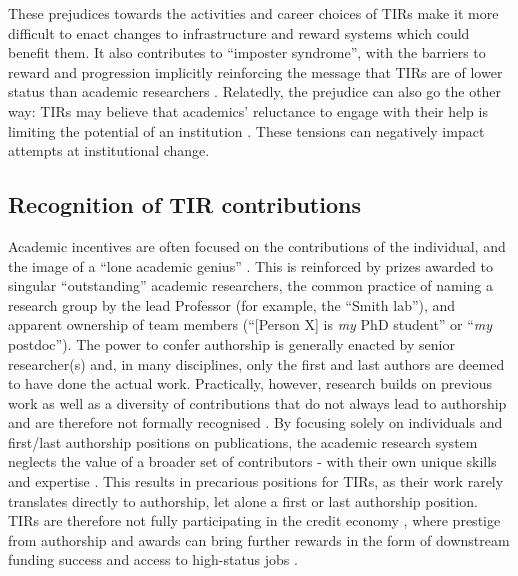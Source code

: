 \documentclass[authordate,meta,issue]{jote-new-article}
\begin{document}
These prejudices towards the activities and career choices of TIRs make it more difficult to enact changes to infrastructure and reward systems which could benefit them. It also contributes to “imposter syndrome”, with the barriers to reward and progression implicitly reinforcing the message that TIRs are of lower status than academic researchers \parencites{Sims2021}{UKRI-ResearchEngland2022}. Relatedly, the prejudice can also go the other way: TIRs may believe that academics' reluctance to engage with their help is limiting the potential of an institution \parencites{Harloe2005}. These tensions can negatively impact attempts at institutional change.



\subsection{Recognition of TIR contributions}



Academic incentives are often focused on the contributions of the individual, and the image of a “lone academic genius” \parencites{Elkins-tanton2021}. This is reinforced by prizes awarded to singular “outstanding” academic researchers, the common practice of naming a research group by the lead Professor (for example, the “Smith lab”), and apparent ownership of team members (“[Person X] is \emph{my} PhD student” or “\emph{my} postdoc”). The power to confer authorship is generally enacted by senior researcher(s) and, in many disciplines, only the first and last authors are deemed to have done the actual work. Practically, however, research builds on previous work as well as a diversity of contributions that do not always lead to authorship and are therefore not formally recognised \parencites{Coles2022}{Forscher2020}{Shirazi2014}{Tiokhin2021}. By focusing solely on individuals and first/last authorship positions on publications, the academic research system neglects the value of a broader set of contributors - with their own unique skills and expertise \parencites{Baum2022}. This results in precarious positions for TIRs, as their work rarely translates directly to authorship, let alone a first or last authorship position. TIRs are therefore not fully participating in the credit economy \parencites{Zollman2018}, where prestige from authorship and awards can bring further rewards in the form of downstream funding success and access to high-status jobs \parencites{Huebner2020}.
\end{document}
